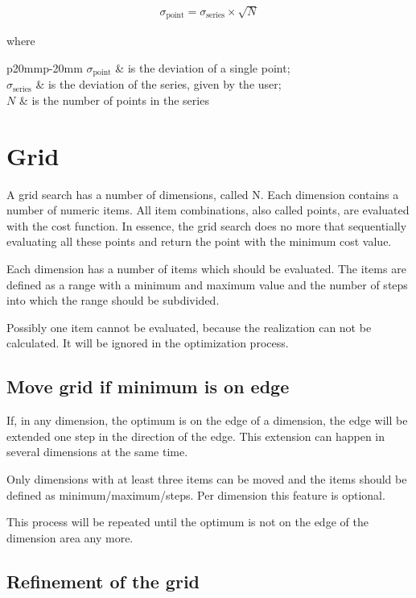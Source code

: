 \begin{align}
\label{eq:CostPoint}
\sigma_{\text{point}} = \sigma_{\text{series}} \times \sqrt{N}
\end{align}

where
\begin{longtable*}{p{20mm}p{\textwidth-24pt-20mm}}
	$\sigma_{\text{point}}$ & is the deviation of a single point; \\
	$\sigma_{\text{series}}$ & is the deviation of the series, given by the user; \\
	$N$ & is the number of points in the series \\
\end{longtable*}
\fi

\section{Grid} \label{sec:GridSearch}

A grid search has a number of dimensions, called N. Each dimension contains a number of numeric items.
All item combinations, also called points, are evaluated with the cost function.
In essence, the grid search does no more that sequentially evaluating all these points and return the point with the minimum cost value.

Each dimension has a number of items which should be evaluated.
The items are defined as a range with a minimum and maximum value and the number of steps into which the range should be subdivided.

Possibly one item cannot be evaluated, because the realization can not be calculated.
It will be ignored in the optimization process.

\subsection{Move grid if minimum is on edge} \label{sec:MoveGrid}

If, in any dimension, the optimum is on the edge of a dimension,
the edge will be extended one step in the direction of the edge.
This extension can happen in several dimensions at the same time. 

Only dimensions with at least three items can be moved and the items should be defined as minimum/maximum/steps.
Per dimension this feature is optional.

This process will be repeated until the optimum is not on the edge of the dimension area any more.

\subsection{Refinement of the grid}\label{sec:RefineGrid}

